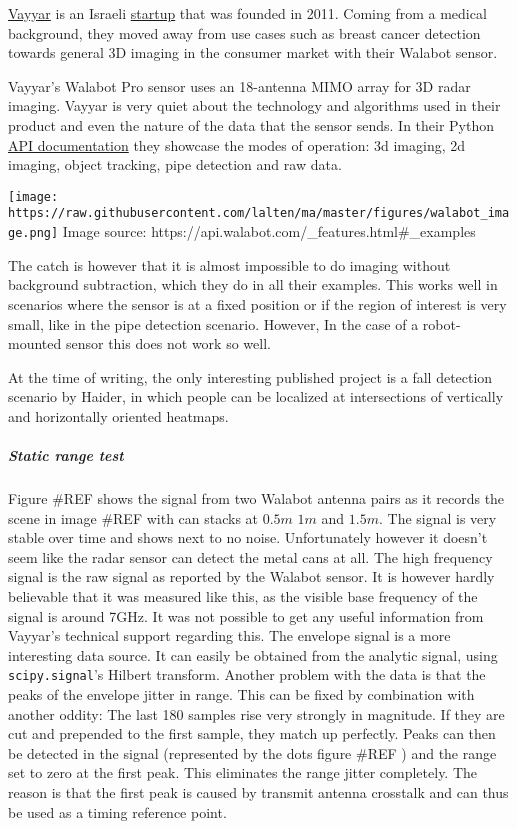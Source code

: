 \href{https://www.vayyar.com/}{Vayyar} is an Israeli
\href{https://www.crunchbase.com/organization/vayyar}{startup} that was
founded in 2011. Coming from a medical background, they moved away from
use cases such as breast cancer detection towards general 3D imaging in
the consumer market with their Walabot sensor.

Vayyar's Walabot Pro sensor uses an 18-antenna MIMO array for 3D radar
imaging. Vayyar is very quiet about the technology and algorithms used
in their product and even the nature of the data that the sensor sends.
In their Python \href{https://api.walabot.com}{API documentation} they
showcase the modes of operation: 3d imaging, 2d imaging, object
tracking, pipe detection and raw data.

\texttt{[image: https://raw.githubusercontent.com/lalten/ma/master/figures/walabot\_image.png]}
Image source: https://api.walabot.com/\_features.html\#\_examples

The catch is however that it is almost impossible to do imaging without
background subtraction, which they do in all their examples. This works
well in scenarios where the sensor is at a fixed position or if the
region of interest is very small, like in the pipe detection scenario.
However, In the case of a robot-mounted sensor this does not work so
well.

At the time of writing, the only interesting published project is a fall
detection scenario \cite{Haider2017} by Haider, in which people can be
localized at intersections of vertically and horizontally oriented
heatmaps.

\subparagraph{Static range test}\label{static-range-test}

Figure \#REF shows the signal from two Walabot antenna pairs as it
records the scene in image \#REF with can stacks at \(0.5m\) \(1m\) and
\(1.5m\). The signal is very stable over time and shows next to no
noise. Unfortunately however it doesn't seem like the radar sensor can
detect the metal cans at all. The high frequency signal is the raw
signal as reported by the Walabot sensor. It is however hardly
believable that it was measured like this, as the visible base frequency
of the signal is around 7GHz. It was not possible to get any useful
information from Vayyar's technical support regarding this. The envelope
signal is a more interesting data source. It can easily be obtained from
the analytic signal, using \texttt{scipy.signal}'s Hilbert transform.
Another problem with the data is that the peaks of the envelope jitter
in range. This can be fixed by combination with another oddity: The last
180 samples rise very strongly in magnitude. If they are cut and
prepended to the first sample, they match up perfectly. Peaks can then
be detected in the signal (represented by the dots figure \#REF ) and
the range set to zero at the first peak. This eliminates the range
jitter completely. The reason is that the first peak is caused by
transmit antenna crosstalk and can thus be used as a timing reference
point.

